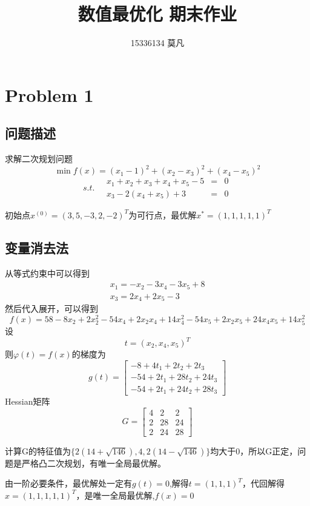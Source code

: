\documentclass[11pt,a4paper]{article}
\begin{document}
\title{数值最优化 期末作业}
\author{15336134 莫凡}
\maketitle
\tableofcontents
\newpage

\section{Problem 1}

\subsection{问题描述}

求解二次规划问题\[\min f(x)=(x_1-1)^2+(x_2-x_3)^2+(x_4-x_5)^2\]
\[s.t.\quad\begin{array}{rcl}
	x_1+x_2+x_3+x_4+x_5-5 & = & 0\\
	x_3-2(x_4+x_5)+3 & = & 0
\end{array}\]

初始点$x^{(0)}=(3, 5, -3, 2, -2)^T$为可行点，最优解$x^*=(1,1,1,1,1)^T$

\subsection{变量消去法}

从等式约束中可以得到\[\begin{array}{l}
x_1=-x_2-3x_4-3x_5+8\\
x_3=2x_4+2x_5-3
\end{array}\]
然后代入展开，可以得到\[f(x)=58-8x_2+2x_2^2-54x_4+2x_2x_4+14x_4^2-54x_5+2x_2x_5+24x_4x_5+14x_5^2\]
设\[t=(x_2,x_4,x_5)^T\]
则$\varphi(t)=f(x)$的梯度为
\[g(t)=\begin{bmatrix}
-8+4t_1+2t_2+2t_3\\
-54+2t_1+28t_2+24t_3\\
-54+2t_1+24t_2+28t_3
\end{bmatrix}\]
Hessian矩阵\[G=\begin{bmatrix}
4 & 2 & 2\\
2 & 28 & 24\\
2 & 24 & 28
\end{bmatrix}\]

计算G的特征值为$\{2(14+\sqrt{146}),4,2(14-\sqrt{146})\}$均大于0，所以G正定，问题是严格凸二次规划，有唯一全局最优解。

由一阶必要条件，最优解处一定有$g(t)=0$,解得$t=(1,1,1)^T$，代回解得$x=(1,1,1,1,1)^T$，是唯一全局最优解,$f(x)=0$
\end{document}
